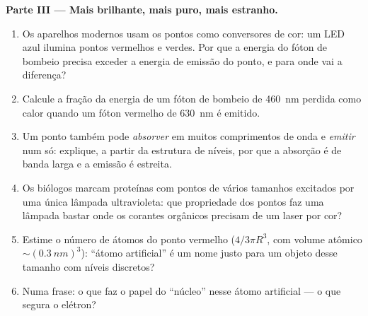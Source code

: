 \begin{problem}
\medskip\noindent\textbf{Parte III --- Mais brilhante, mais puro, mais estranho.}
\begin{enumerate}[resume]
  \item Os aparelhos modernos usam os pontos como conversores de cor:
        um LED azul ilumina pontos vermelhos e verdes. Por que a
        energia do fóton de bombeio precisa exceder a energia de
        emissão do ponto, e para onde vai a diferença?
  \item Calcule a fração da energia de um fóton de bombeio de
        \qty{460}{nm} perdida como calor quando um fóton vermelho de
        \qty{630}{nm} é emitido.
  \item Um ponto também pode \emph{absorver} em muitos comprimentos de
        onda e \emph{emitir} num só: explique, a partir da estrutura de
        níveis, por que a absorção é de banda larga e a emissão é
        estreita.
  \item Os biólogos marcam proteínas com pontos de vários tamanhos
        excitados por uma única lâmpada ultravioleta: que propriedade
        dos pontos faz uma lâmpada bastar onde os corantes orgânicos
        precisam de um laser por cor?
  \item Estime o número de átomos do ponto vermelho ($4/3\pi R^3$, com
        volume atômico $\sim(\qty{0.3}{nm})^3$): ``átomo artificial'' é
        um nome justo para um objeto desse tamanho com níveis
        discretos?
  \item Numa frase: o que faz o papel do ``núcleo'' nesse átomo
        artificial --- o que segura o elétron?
\end{enumerate}


\end{problem}
